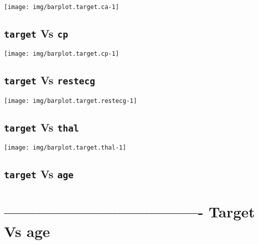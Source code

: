 \documentclass[]{article}
\begin{document}
\begin{center}\texttt{[image: img/barplot.target.ca-1]} \end{center}

\hypertarget{target-vs-cp}{%
\subsection{\texorpdfstring{\texttt{target} Vs
\texttt{cp}}{target Vs cp}}\label{target-vs-cp}}

\begin{center}\texttt{[image: img/barplot.target.cp-1]} \end{center}

\hypertarget{target-vs-restecg}{%
\subsection{\texorpdfstring{\texttt{target} Vs
\texttt{restecg}}{target Vs restecg}}\label{target-vs-restecg}}

\begin{center}\texttt{[image: img/barplot.target.restecg-1]} \end{center}

\hypertarget{target-vs-thal}{%
\subsection{\texorpdfstring{\texttt{target} Vs
\texttt{thal}}{target Vs thal}}\label{target-vs-thal}}

\begin{center}\texttt{[image: img/barplot.target.thal-1]} \end{center}

\hypertarget{target-vs-age}{%
\subsection{\texorpdfstring{\texttt{target} Vs
\texttt{age}}{target Vs age}}\label{target-vs-age}}

\hypertarget{section}{%
\section{}\label{section}}

\hypertarget{target-vs-age-1}{%
\section{------------------------------------- Target Vs
age}\label{target-vs-age-1}}
\end{document}
